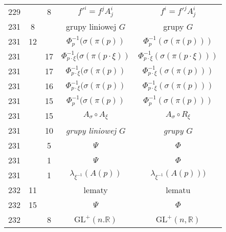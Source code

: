 \documentclass[a4paper,11pt]{article}
\newcommand{\mb}{\mathbb}
\newcommand{\mr}{\mathrm}
\newcommand{\GL}{\mr{GL}}
\newcommand{\la}{\lambda}
\newcommand{\s}{\sigma}
\newcommand{\R}{\mb{R}}
\begin{document}
\begin{center}
\begin{tabular}{|c|c|c|c|c|}
    229 & &  8 & $f'^{ i } = f^{ j } A^{ i }_{ j }$ & $f^{ i } = f'^{ j }
                                                      A^{ i }_{ j }$ \\
    231 &  8 & & grupy liniowej $G$ & grupy $G$ \\
    231 & 12 & & $\Phi^{ -1 }_{ p }( \s( \pi( p ) )$
           & $\Phi^{ -1 }_{ p }( \s( \pi( p ) ) )$ \\
    231 & & 17 & $\Phi^{ -1 }_{ p \cdot \xi }( \s( \pi( p \cdot \xi ) )$
           & $\Phi^{ -1 }_{ p \cdot \xi }( \s( \pi( p \cdot \xi ) ) )$ \\
    231 & & 17 & $\Phi^{ -1 }_{ p \cdot \xi }( \s( \pi( p ) )$
           & $\Phi^{ -1 }_{ p \cdot \xi }( \s( \pi( p ) ) )$ \\
    231 & & 16 & $\Phi^{ -1 }_{ p \cdot \xi }( \s( \pi( p ) )$
           & $\Phi^{ -1 }_{ p \cdot \xi }( \s( \pi( p ) ) )$ \\
    231 & & 15 & $\Phi^{ -1 }_{ p }( \s( \pi( p ) )$
           & $\Phi^{ -1 }_{ p }( \s( \pi( p ) ) )$ \\
    231 & & 15 & $A_{ \s } \circ A_{ \xi }$ & $A_{ \s } \circ R_{ \xi }$ \\
    231 & & 10 & \emph{grupy liniowej $G$} & \emph{grupy $G$} \\
    231 & &  5 & $\Psi$ & $\Phi$ \\
    231 & &  1 & $\Psi$ & $\Phi$ \\
    231 & &  1 & $\la_{ \xi^{ -1 } }( A( p ) )$
           & $\la_{ \xi^{ -1 } }( A( p ) ) )$ \\
    232 & 11 & & lematy & lematu \\
    232 & 15 & & $\Psi$ & $\Phi$ \\
    232 & & 8 & $\GL^{ + }( n. \R )$ & $\GL^{ + }( n, \R )$ \\
    \hline
  \end{tabular}


\end{center}
\end{document}

